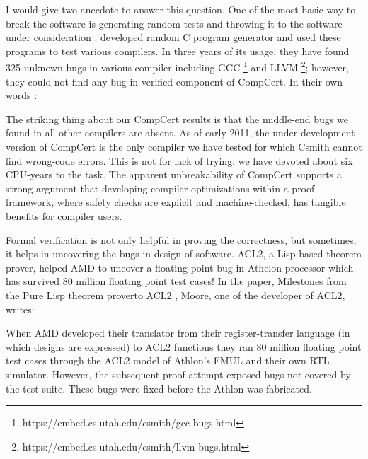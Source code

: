 	I would give two anecdote to answer this question. 
	One of the most basic way to 
	break the software is generating random tests and throwing it to 
	the software under consideration \cite{Miller:1990:ESR:96267.96279}.
	\cite{Yang:2011:FUB:1993316.1993532} developed random 
	C program generator and used these programs to test various 
	compilers. In three years of its usage, they have found 325 unknown
	bugs in various compiler including GCC
	\footnote{https://embed.cs.utah.edu/csmith/gcc-bugs.html} and LLVM
	\footnote{https://embed.cs.utah.edu/csmith/llvm-bugs.html}; however, 
	they could not find any bug in verified component of CompCert. 
	In their own words \cite{Yang:2011:FUB:1993316.1993532}:
	
	\begin{displayquote}
	
	The striking thing about our CompCert results is that the middle-end 
	bugs we found in all other compilers are absent. As of early 2011,
	the under-development version of CompCert is the only compiler we
	have tested for which Csmith cannot find wrong-code errors. This is
	not for lack of trying: we have devoted about six CPU-years to the
	task. The apparent unbreakability of CompCert supports a strong
	argument that developing compiler optimizations within a proof
	framework, where safety checks are explicit and machine-checked,
	has tangible benefits for compiler users.
	
	\end{displayquote}
	
	\noindent
	Formal verification is not only helpful in proving the correctness, 
	but sometimes, it helps in uncovering the bugs in design of
	software. ACL2, a Lisp based theorem prover, helped 
	AMD to uncover a floating point bug in Athelon processor which 
	has survived 80 million floating point test cases! 
	In the paper, Milestones from the Pure Lisp theorem proverto ACL2
	\cite{Moore2019}, Moore, one of the developer of ACL2, writes:
	
	\begin{displayquote}
	
	When AMD developed their translator 
	from their register-transfer language (in which designs
	are expressed) to ACL2 functions they ran 80 million 
	floating point test cases through the ACL2 model of 
	Athlon’s FMUL and their own RTL simulator. However, the 
	subsequent proof attempt exposed bugs not covered by the
	test suite. These bugs were fixed before the Athlon was 
	fabricated.
	
	\end{displayquote}
	
